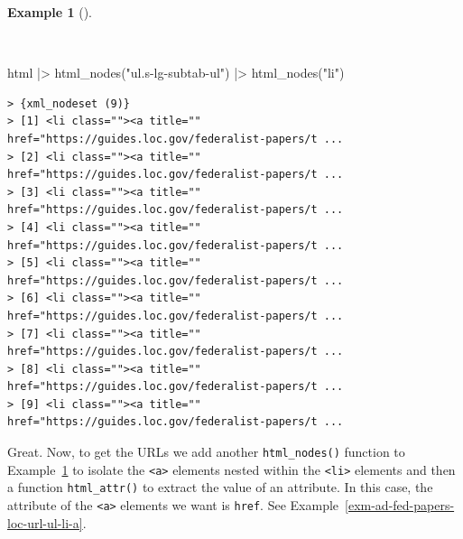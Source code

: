 \documentclass[
  letterpaper,
  DIV=11,
  numbers=noendperiod]{scrreport}
\newenvironment{Shaded}{\begin{snugshade}}{\end{snugshade}}
\newcommand{\FunctionTok}[1]{\textcolor[rgb]{0.00,0.00,0.00}{#1}}
\newcommand{\NormalTok}[1]{\textcolor[rgb]{0.00,0.00,0.00}{#1}}
\newcommand{\SpecialCharTok}[1]{\textcolor[rgb]{0.00,0.00,0.00}{#1}}
\newcommand{\StringTok}[1]{\textcolor[rgb]{0.00,0.00,0.00}{#1}}
\theoremstyle{definition}
\newtheorem{example}{Example}[chapter]
\theoremstyle{remark}
\begin{document}
\begin{example}[]\protect\hypertarget{exm-ad-fed-papers-loc-url-ul-class-s-lg-subtab-ul}{}\label{exm-ad-fed-papers-loc-url-ul-class-s-lg-subtab-ul}

~

\begin{Shaded}
\begin{Highlighting}[]
\NormalTok{html }\SpecialCharTok{|\textgreater{}} 
  \FunctionTok{html\_nodes}\NormalTok{(}\StringTok{"ul.s{-}lg{-}subtab{-}ul"}\NormalTok{) }\SpecialCharTok{|\textgreater{}} 
  \FunctionTok{html\_nodes}\NormalTok{(}\StringTok{"li"}\NormalTok{)}
\end{Highlighting}
\end{Shaded}

\begin{verbatim}
> {xml_nodeset (9)}
> [1] <li class=""><a title="" href="https://guides.loc.gov/federalist-papers/t ...
> [2] <li class=""><a title="" href="https://guides.loc.gov/federalist-papers/t ...
> [3] <li class=""><a title="" href="https://guides.loc.gov/federalist-papers/t ...
> [4] <li class=""><a title="" href="https://guides.loc.gov/federalist-papers/t ...
> [5] <li class=""><a title="" href="https://guides.loc.gov/federalist-papers/t ...
> [6] <li class=""><a title="" href="https://guides.loc.gov/federalist-papers/t ...
> [7] <li class=""><a title="" href="https://guides.loc.gov/federalist-papers/t ...
> [8] <li class=""><a title="" href="https://guides.loc.gov/federalist-papers/t ...
> [9] <li class=""><a title="" href="https://guides.loc.gov/federalist-papers/t ...
\end{verbatim}

\end{example}

Great. Now, to get the URLs we add another \texttt{html\_nodes()}
function to
Example~\ref{exm-ad-fed-papers-loc-url-ul-class-s-lg-subtab-ul} to
isolate the \texttt{\textless{}a\textgreater{}} elements nested within
the \texttt{\textless{}li\textgreater{}} elements and then a function
\texttt{html\_attr()} to extract the value of an attribute. In this
case, the attribute of the \texttt{\textless{}a\textgreater{}} elements
we want is \texttt{href}. See
Example~\ref{exm-ad-fed-papers-loc-url-ul-li-a}.
\end{document}
